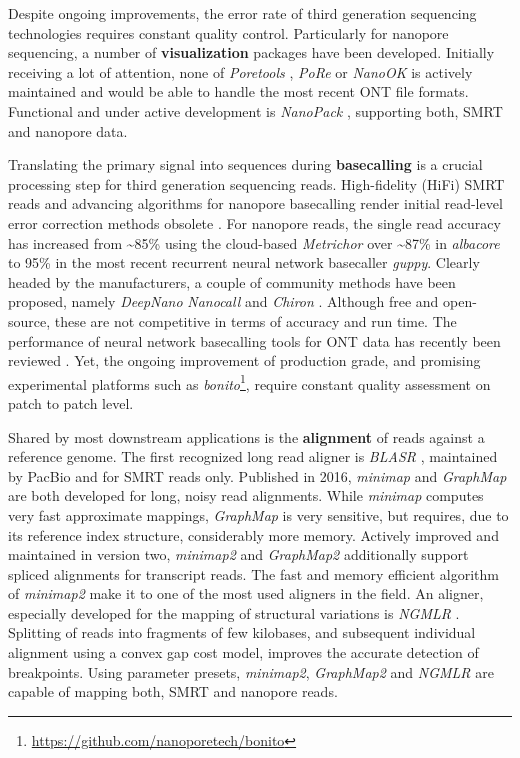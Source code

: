 Despite ongoing improvements, the error rate of third generation sequencing technologies requires constant quality control. Particularly for nanopore sequencing, a number of \textbf{visualization} packages have been developed.
Initially receiving a lot of attention, none of \textit{Poretools} \cite{Loman2014},
\textit{PoRe} \cite{Watson2014} or \textit{NanoOK} \cite{Leggett2016} is actively maintained and would be able to handle the most recent ONT file formats.
Functional and under active development is \textit{NanoPack} \cite{DeCoster2018}, supporting both, SMRT and nanopore data.

Translating the primary signal into sequences during \textbf{basecalling} is a crucial processing step for third generation sequencing reads.
High-fidelity (HiFi) SMRT reads and advancing algorithms for nanopore basecalling render initial read-level error correction methods obsolete \cite{Koren2012, Hackl2014, Goodwin2015}.
For nanopore reads, the single read accuracy has increased from \textasciitilde85\% using the cloud-based \textit{Metrichor} over \textasciitilde87\% in \textit{albacore} to 95\% in the most recent recurrent neural network basecaller \textit{guppy}.
Clearly headed by the manufacturers, a couple of community methods have been proposed, namely 
\textit{DeepNano} \cite{Boza2017} \textit{Nanocall} \cite{David2017} and \textit{Chiron} \cite{Teng2018}.
Although free and open-source, these are not competitive in terms of accuracy and run time.
The performance of neural network basecalling tools for ONT data has recently been reviewed \cite{Wick2019}.
Yet, the ongoing improvement of production grade, and promising experimental platforms such as \textit{bonito}\footnote{\url{https://github.com/nanoporetech/bonito}}, require constant quality assessment on patch to patch level.

Shared by most downstream applications is the \textbf{alignment} of reads against a reference genome.
The first recognized long read aligner is \textit{BLASR} \cite{Chaisson2012}, maintained by PacBio and for SMRT reads only.
Published in 2016, \textit{minimap} \cite{Li2016} and \textit{GraphMap} \cite{Sovic2016} are both developed for long, noisy read alignments.
While \textit{minimap} computes very fast approximate mappings, \textit{GraphMap} is very sensitive, but requires, due to its reference index structure, considerably more memory.
Actively improved and maintained in version two, \textit{minimap2} \cite{Li2018} and \textit{GraphMap2} \cite{Maric2019} additionally support spliced alignments for transcript reads.
The fast and memory efficient algorithm of \textit{minimap2} make it to one of the most used aligners in the field.
An aligner, especially developed for the mapping of structural variations is \textit{NGMLR} \cite{Sedlazeck2018}.
Splitting of reads into fragments of few kilobases, and subsequent individual alignment using a convex gap cost model, improves the accurate detection of breakpoints.
Using parameter presets, \textit{minimap2}, \textit{GraphMap2} and \textit{NGMLR} are capable of mapping both, SMRT and nanopore reads.




